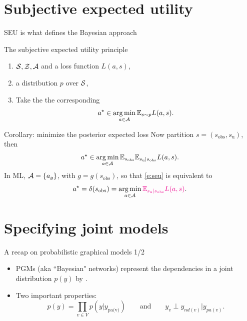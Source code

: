 \documentclass[10pt]{beamer}
\begin{document}
\section{Subjective expected utility}
\begin{frame}{SEU is what defines the Bayesian approach}
\begin{block}{The subjective expected utility principle}
\begin{enumerate}
\item {} $\mathcal{S}, \mathcal{Z}, \mathcal{A}$ and a loss function $L(a,s)$,
\item {} a distribution $p$ over $\mathcal{S}$,
\item Take the the corresponding 
\begin{equation}
a^\star \in \operatorname*{arg\,min}_{a\in\mathcal{A}} \mathbb{E}_{s\sim p} L(a,s).
\label{e:seu}
\end{equation}
\end{enumerate}
\end{block}
\vfill

\begin{block}{Corollary: minimize the posterior expected loss}
Now partition $s=(s_{\text{obs}}, s_{\text{u}})$, then 
$$ a^\star \in \operatorname*{arg\,min}_{a\in\mathcal{A}} \mathbb{E}_{s_{\text{obs}}} \mathbb{E}_{s_{\text{u}}\vert s_{\text{obs}}} L(a,s).$$
In ML, $\mathcal{A} = \{a_g\}$, with $g = g(s_\text{obs})$, so that
\eqref{e:seu} is equivalent to
$$
a^\star = \delta(s_\text{obs}) = \operatorname*{arg\,min}_{a\in\mathcal{A}} \textcolor{magenta}{\mathbb{E}_{s_{\text{u}}\vert s_{\text{obs}}} L(a,s)}.$$
\end{block}
\end{frame}

\section{Specifying joint models}
\begin{frame}{A recap on probabilistic graphical models 1/2}
  \begin{itemize}
    \item PGMs (aka ``Bayesian" networks) represent the dependencies in a joint distribution $p(y)$ by .
    \item Two important properties:
    $$
    p(y) = \prod_{v\in V} p(y\vert y_{\text{pa(v)}}) \qquad\text{and}\qquad
    y_v \perp y_{nd(v)} \vert y_{pa(v)}.
    $$
    \blank
  \end{itemize}
  \blank
\end{frame}
\end{document}
